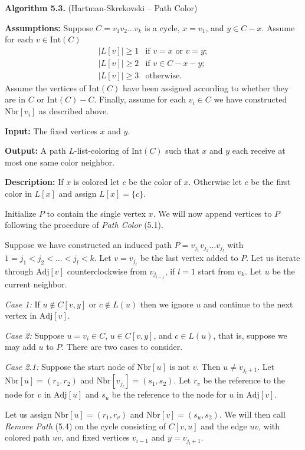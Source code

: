 \documentclass[letterpaper, 12pt]{article}
\theoremstyle{definition}
\theoremstyle{definition}
\theoremstyle{thm}
\theoremstyle{definition}
\begin{document}
\noindent\textbf{Algorithm 5.3.} (Hartman-Skrekovski -- Path Color)

\noindent\textbf{Assumptions:} Suppose $C=v_1v_2\ldots v_k$ is a cycle, $x=v_1$,
and $y\in C-x$. Assume for each $v\in \text{Int}(C)$
\[
    \begin{array}{ll}
	    |L[v]|\ge 1 & \text{if } v=x \text{ or } v=y;\\
	    |L[v]|\ge 2 & \text{if } v\in C-x-y;\\
	    |L[v]|\ge 3 & \text{otherwise.}
    \end{array}
\]
Assume the vertices of
$\text{Int}(C)$ have been assigned according to whether they are in $C$ or
$\text{Int}(C)-C$. Finally, assume for each $v_i\in C$ we have constructed
$\text{Nbr}[v_i]$ as described above.

\noindent\textbf{Input:} The fixed vertices $x$ and $y$.

\noindent\textbf{Output:} A path $L$-list-coloring of $\text{Int}(C)$ such that
$x$ and $y$ each receive at most one same color neighbor.

\noindent\textbf{Description:} If $x$ is colored let $c$ be the color of $x$.
Otherwise let $c$ be the first color in $L[x]$ and assign
$L[x]=\{c\}$.

Initialize $P$ to contain the single vertex $x$. We will now
append vertices to $P$ following the procedure of \textit{Path Color} (5.1).

Suppose we have constructed an induced path $P=v_{j_1}v_{j_2}\ldots v_{j_l}$
with $1=j_1<j_2<\ldots<j_l< k$. Let $v=v_{j_l}$ be the last vertex added to $P$.
Let us iterate through $\text{Adj}[v]$ counterclockwise from $v_{j_{l-1}}$, if
$l=1$ start from $v_k$. Let $u$ be the current neighbor.

\textit{Case 1:} If $u\not\in C[v,y]$ or $c\not\in L(u)$ then we ignore $u$ and
continue to the next vertex in $\text{Adj}[v]$.

\textit{Case 2:} Suppose $u=v_i\in C$,
$u\in C[v,y]$, and $c\in L(u)$, that is, suppose we may add $u$ to $P$.
There are two cases to consider.

\textit{Case 2.1:} Suppose the start node of $\text{Nbr}[u]$ is not $v$. Then
$u\ne v_{j_l +1}$. Let $\text{Nbr}[u]=(r_1,r_2)$ and
$\text{Nbr}[v_{j_l}]=(s_1,s_2)$. Let $r_v$ be the reference to the node for
$v$ in $\text{Adj}[u]$ and $s_u$ be the reference to the node for $u$ in
$\text{Adj}[v]$.

Let us assign $\text{Nbr}[u]=(r_1,r_v)$ and $\text{Nbr}[v]=(s_u,s_2)$. We will
then call \textit{Remove Path} (5.4) on the cycle consisting of $C[v,u]$ and the
edge $uv$, with colored path $uv$, and fixed vertices $v_{i-1}$ and
$y=v_{j_l+1}$.
\end{document}
